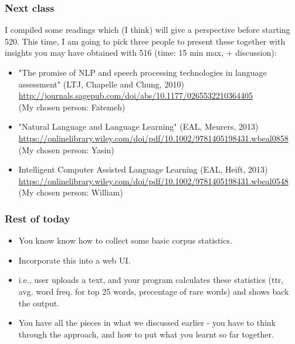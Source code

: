 \documentclass{beamer}
\begin{document}
\begin{frame}
\frametitle{Next class}
I compiled some readings which (I think) will give a perspective before starting 520. This time, I am going to pick three people to present these together with insights you may have obtained with 516 (time: 15 min max, + discussion): \small
\begin{itemize}
\item "The promise of NLP and speech processing technologies in language assessment" (LTJ, Chapelle and Chung, 2010)
\\ \footnotesize \url{http://journals.sagepub.com/doi/abs/10.1177/0265532210364405}
\\ (My chosen person: Fatemeh) \small
\item "Natural Language and Language Learning" (EAL, Meurers, 2013)
\\ \footnotesize \url{https://onlinelibrary.wiley.com/doi/pdf/10.1002/9781405198431.wbeal0858}
\\(My chosen person: Yasin) \small
\item Intelligent Computer Assisted Language Learning (EAL, Heift, 2013)
\\ \footnotesize \url{https://onlinelibrary.wiley.com/doi/pdf/10.1002/9781405198431.wbeal0548}
\\(My chosen person: William) \small
\end{itemize}
\end{frame}

\begin{frame}
\frametitle{Rest of today}
\begin{itemize}
\item You know know how to collect some basic corpus statistics.
\item Incorporate this into a web UI.
\item i.e., user uploads a text, and your program calculates these statistics (ttr, avg. word freq. for top 25 words, precentage of rare words) and shows back the output.
\item You have all the pieces in what we discussed earlier - you have to think through the approach, and how to put what you learnt so far together.
\end{itemize}
\end{frame}
\end{document}
